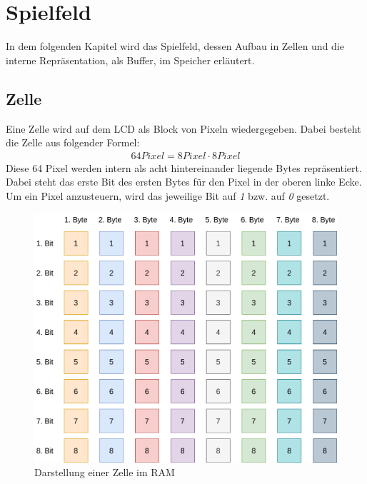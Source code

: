 \section{Spielfeld}
    In dem folgenden Kapitel wird das Spielfeld, dessen Aufbau in Zellen und die interne Repräsentation, 
    als Buffer, im Speicher erläutert.


    \subsection{Zelle}
        Eine Zelle wird auf dem LCD als Block von Pixeln wiedergegeben.
        Dabei besteht die Zelle aus folgender Formel:
        \begin{align}
        64 Pixel = 8 Pixel \cdot 8 Pixel
        \end{align}
        Diese 64 Pixel werden intern als acht hintereinander liegende Bytes repräsentiert.
        Dabei steht das erste Bit des ersten Bytes für den Pixel in der oberen linke Ecke.
        Um ein Pixel anzusteuern, wird das jeweilige Bit auf \textit{1} bzw. auf \textit{0} gesetzt.
        \begin{figure}[H]
            \centering
            \includegraphics[scale=0.25]{img/zelle.png}    
            \caption{Darstellung einer Zelle im RAM}
        \end{figure}
    
